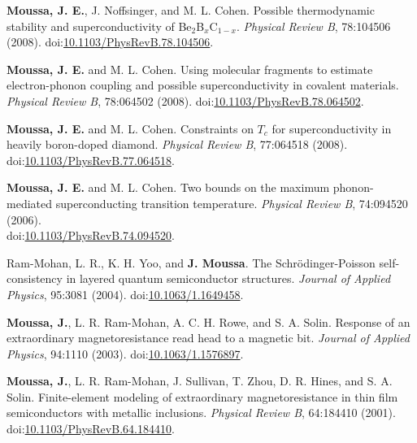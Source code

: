 \documentclass[10pt]{article}
\makeatletter
\newlength{\bibhang}
\newlength{\bibsep}
 {\@listi \global\bibsep\itemsep \global\advance\bibsep by\parsep}
\newenvironment{bibsection}%
        {\vspace{-1.6\baselineskip}\begin{etaremune}[leftmargin=1.6em]{%
       \setlength{\leftmargin}{\bibhang}%
       \setlength{\itemindent}{-\leftmargin}%
       \setlength{\itemsep}{\bibsep}%
       \setlength{\parsep}{\z@}%
        \setlength{\partopsep}{0pt}%
        \setlength{\topsep}{0pt}}}
        {\end{etaremune}\vspace{-.6\baselineskip}}
\newcommand\doilink[1]{\href{http://dx.doi.org/#1}{#1}}
\newcommand\doi[1]{doi:\doilink{#1}}
\makeatother
\begin{document}
\begin{bibsection}
    \item \textbf{Moussa, J. E.}, J. Noffsinger, and M. L. Cohen.
         Possible thermodynamic stability and superconductivity of Be$_2$B$_x$C$_{1-x}$.
         \emph{Physical Review B}, 78:104506 (2008). \doi{10.1103/PhysRevB.78.104506}.

    \item \textbf{Moussa, J. E.} and M. L. Cohen.
         Using molecular fragments to estimate electron-phonon coupling and possible superconductivity in covalent materials.
         \emph{Physical Review B}, 78:064502 (2008). \doi{10.1103/PhysRevB.78.064502}.

    \item \textbf{Moussa, J. E.} and M. L. Cohen.
         Constraints on $T_c$ for superconductivity in heavily boron-doped diamond.
         \emph{Physical Review B}, 77:064518 (2008). \\ \doi{10.1103/PhysRevB.77.064518}.

    \item \textbf{Moussa, J. E.} and M. L. Cohen.
         Two bounds on the maximum phonon-mediated superconducting transition temperature.
         \emph{Physical Review B}, 74:094520 (2006). \\ \doi{10.1103/PhysRevB.74.094520}.

    \item Ram-Mohan, L. R., K. H. Yoo, and \textbf{J. Moussa}.
         The Schr\"odinger-Poisson self-consistency in layered quantum semiconductor structures.
         \emph{Journal of Applied Physics}, 95:3081 (2004). \doi{10.1063/1.1649458}.

    \item \textbf{Moussa, J.}, L. R. Ram-Mohan, A. C. H. Rowe, and S. A. Solin.
        Response of an extraordinary magnetoresistance read head to a magnetic bit.
        \emph{Journal of Applied Physics}, 94:1110 (2003). \doi{10.1063/1.1576897}.

    \item \textbf{Moussa, J.}, L. R. Ram-Mohan, J. Sullivan, T. Zhou, D. R. Hines, and S. A. Solin.
        Finite-element modeling of extraordinary magnetoresistance in thin film semiconductors with metallic inclusions.
        \emph{Physical Review B}, 64:184410 (2001). \doi{10.1103/PhysRevB.64.184410}.

\end{bibsection}
\end{document}
